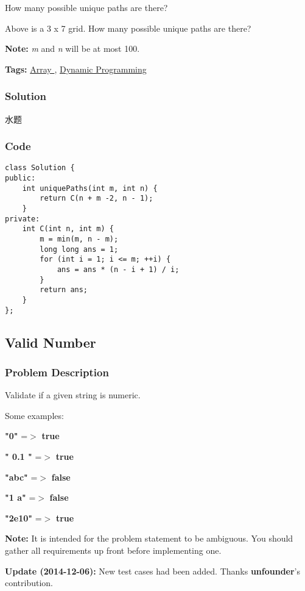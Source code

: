 \documentclass{article}
\begin{document}
\begin{CJK*}{UTF8}{gkai}
How many possible unique paths are there?

Above is a 3 x 7 grid. How many possible unique paths are there?

\textbf{Note:} \emph{m} and \emph{n} will be at most 100.


\textbf{Tags: }
\hyperref[ Array ]{ Array },  \hyperref[ Dynamic Programming ]{ Dynamic Programming }



\subsubsection*{Solution}
水题

\subsubsection*{Code}
\begin{lstlisting}
class Solution {
public:
    int uniquePaths(int m, int n) {
        return C(n + m -2, n - 1);
    }
private:
    int C(int n, int m) {
        m = min(m, n - m);
        long long ans = 1;
        for (int i = 1; i <= m; ++i) {
            ans = ans * (n - i + 1) / i;
        }
        return ans;
    }
}; 
\end{lstlisting}


\subsection{ Valid Number }
\label{ Valid Number }

\subsubsection*{Problem Description}
Validate if a given string is numeric.

Some examples:


\textbf{"0"} =$>$ \textbf{true}


\textbf{"   0.1  "} =$>$ \textbf{true}


\textbf{"abc"} =$>$ \textbf{false}


\textbf{"1 a"} =$>$ \textbf{false}


\textbf{"2e10"} =$>$ \textbf{true}

\textbf{Note:} It is intended for the problem statement to be ambiguous. You should gather all requirements up front before implementing one.

\textbf{Update (2014-12-06):}
New test cases had been added. Thanks \textbf{unfounder}'s contribution.



\end{CJK*}
\end{document}

